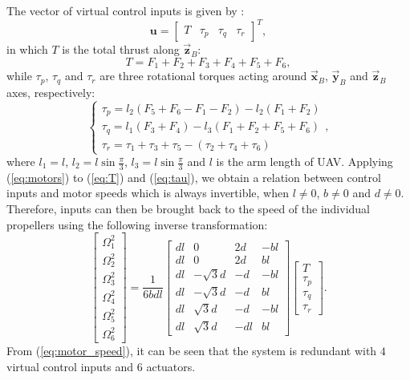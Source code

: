 The vector of virtual control inputs is given by \cite{Mahony2012RAM}:
\begin{equation}
\mathbf{u} = \begin{bmatrix}T & \tau_p & \tau_q & \tau_r \end{bmatrix}^T,
\label{eq:inputs}
\end{equation}
in which $T$ is the total thrust along $\vec{\mathbf{z}}_B$:
\begin{equation}
T = F_1 + F_2 + F_3 + F_4 + F_5 + F_6,
\label{eq:T}
\end{equation}
while $\tau_p$, $\tau_q$ and $\tau_r$ are three rotational torques acting around $\vec{\mathbf{x}}_B$, $\vec{\mathbf{y}}_B$ and $\vec{\mathbf{z}}_B$ axes, respectively:
\begin{equation}
\begin{cases}
\tau_p = l_2 \left( F_5 + F_6 - F_1 - F_2 \right) - l_2 \left( F_1 + F_2 \right) \\
\tau_q = l_1 \left( F_3 + F_4 \right) - l_3 \left( F_1 + F_2 + F_5 + F_6 \right) \\
\tau_r = \tau_1 + \tau_3 + \tau_5 - (\tau_2 + \tau_4 + \tau_6)
\end{cases},
\label{eq:tau}
\end{equation}
where $l_1 = l$, $l_2 = l \sin{\frac{\pi}{3}}$, $l_3 = l \sin{\frac{\pi}{3}}$ and $l$ is the arm length of UAV. Applying (\ref{eq:motors}) to (\ref{eq:T}) and (\ref{eq:tau}), we obtain a relation between control inputs and motor speeds which is always invertible, when $l \neq 0$, $b \neq 0$ and $d \neq 0$. Therefore, inputs can then be brought back to the speed of the individual propellers using the following inverse transformation:
\begin{equation}
\begin{bmatrix} \Omega_1^2 \\ \Omega_2^2 \\ \Omega_3^2 \\ \Omega_4^2 \\ \Omega_5^2 \\ \Omega_6^2 \end{bmatrix} = \frac{1}{6 b d l} \begin{bmatrix} d l & 0 & 2 d & -b l \\ d l & 0 & 2 d & b l \\ d l & -\sqrt{3} d & -d & -b l \\ d l & -\sqrt{3} d & -d & b l \\ d l & \sqrt{3} d & -d & -b l \\ d l & \sqrt{3} d & -d l & b l \end{bmatrix} \begin{bmatrix} T \\ \tau_p \\ \tau_q \\ \tau_r \end{bmatrix}.
\label{eq:motor_speed}
\end{equation}
From (\ref{eq:motor_speed}), it can be seen that the system is redundant with $4$ virtual control inputs and $6$ actuators.
